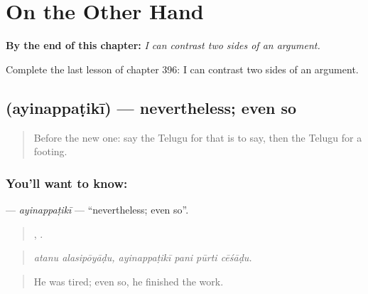 
\chapter{On the Other Hand}
\label{ch:te-on-the-other-hand}

\begin{chapteropening}
\textbf{By the end of this chapter:} \emph{I can contrast two sides of an argument.}

Complete the last lesson of chapter 396: I can contrast two sides of an argument.
\end{chapteropening}

\section[\texorpdfstring{\te{అయినప్పటికీ} (ayinappaṭikī)}{అయినప్పటికీ (ayinappaṭikī)}]{ (ayinappaṭikī) — nevertheless; even so}

\label{lesson:TE-C396-ayinappatiki}



\begin{quote}
Before the new one: say the Telugu for that is to say, then the Telugu for a footing.
\end{quote}

\subsection*{You'll want to know: }
\textbf{} — \emph{ayinappaṭikī} — \textquotedblleft{}nevertheless; even so\textquotedblright{}.

\begin{quote}
 ,    .
\end{quote}

\begin{quote}
\emph{atanu alasipōyāḍu, ayinappaṭikī pani pūrti cēśāḍu.}
\end{quote}

\begin{quote}
He was tired; even so, he finished the work.
\end{quote}

